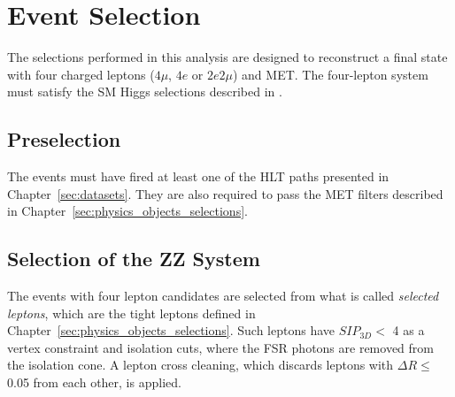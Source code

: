 \chapter{Event Selection}
\label{sec:event_selection}
The selections performed in this analysis are designed to reconstruct a final state with four charged leptons ($4\mu$, $4e$ or $2e2\mu$) and MET. The four-lepton system must satisfy the SM Higgs selections described in \cite{bib:CMS-AN-16-442}. 

\section{Preselection}
The events must have fired at least one of the HLT paths presented in Chapter~\ref{sec:datasets}. They are also required to pass the MET filters described in Chapter~\ref{sec:physics_objects_selections}.

\section{Selection of the ZZ System}
The events with four lepton candidates are selected from what is called \textit{selected leptons}, which are the tight leptons defined in Chapter~\ref{sec:physics_objects_selections}. Such leptons have $SIP_{3D} <$ 4 as a vertex constraint and isolation cuts, where the FSR photons are removed from the isolation cone. A lepton cross cleaning, which discards leptons with $\Delta R \leq$ 0.05 from each other, is applied.

